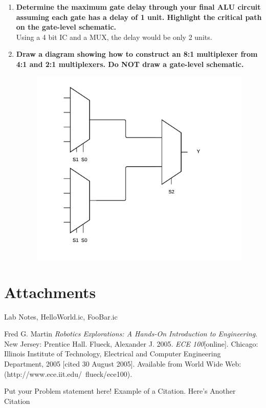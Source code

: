 \documentclass[titlepage]{article}
\begin{document}
\begin{enumerate}
  \newpage

  \item \textbf{Determine the maximum gate delay through your final ALU circuit
  assuming each gate has a delay of 1 unit. Highlight the critical path on the
  gate-level schematic.} \\
    Using a 4 bit IC and a MUX, the delay would be only 2 units.

  \item \textbf{Draw a diagram showing how to construct an 8:1 multiplexer from
  4:1 and 2:1 multiplexers. Do \textbf{NOT} draw a gate-level schematic.} \\
  \begin{figure}[h]
    \begin{center}
      \includegraphics[scale=0.8]{8Mux.png}
    \end{center}
  \end{figure}

\end{enumerate}


\ifx
\section*{Attachments}
Lab Notes, HelloWorld.ic, FooBar.ic

\begin{thebibliography}{9}
 Fred G. Martin \emph{Robotics Explorations: A Hands-On Introduction to Engineering}. New Jersey: Prentice Hall.
  Flueck, Alexander J. 2005. \emph{ECE 100}[online]. Chicago: Illinois Institute of Technology, Electrical and Computer Engineering Department, 2005 [cited 30
August 2005]. Available from World Wide Web: (http://www.ece.iit.edu/~flueck/ece100).
\end{thebibliography}

Put your Problem statement here! Example of a Citation\cite[p.219]{Robotics}. Here's Another Citation\cite{Flueck}
\fi
\end{document}
